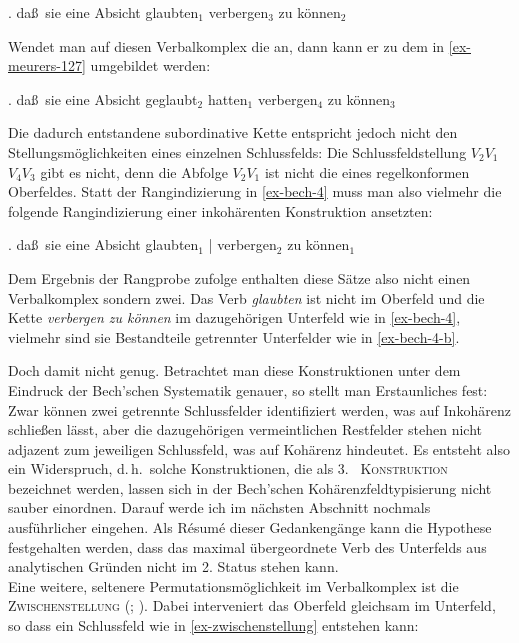 \ex. \label{ex-bech-4} da\ss\ sie eine Absicht glaubten$_1$ verbergen$_3$ zu können$_2$ \hfill \citep[\S 62]{Bech:55} 

Wendet man auf diesen Verbalkomplex die  an, dann kann er zu dem in \ref{ex-meurers-127} umgebildet werden:

\ex. da\ss\ sie eine Absicht geglaubt$_2$ hatten$_1$ verbergen$_4$ zu können$_3$ \\ \citep[(127)]{Meurers:99}\label{ex-meurers-127}

Die dadurch entstandene subordinative Kette entspricht jedoch nicht den Stellungsmöglichkeiten eines einzelnen Schlussfelds: Die Schlussfeldstellung $V_2 V_1$ $V_4 V_3$ gibt es nicht, denn die Abfolge $V_2 V_1$ ist nicht die eines regelkonformen Oberfeldes. Statt der Rangindizierung in \ref{ex-bech-4} muss man also vielmehr die folgende Rangindizierung einer inkohärenten Konstruktion ansetzten:

\ex. \label{ex-bech-4-b}da\ss\ sie eine Absicht glaubten$_1$ | verbergen$_2$ zu können$_1$
 
Dem Ergebnis der Rangprobe zufolge enthalten diese Sätze also nicht einen Verbalkomplex sondern zwei. Das Verb {\it glaubten} ist nicht im Oberfeld und die Kette {\it verbergen zu können} im dazugehörigen Unterfeld wie in \ref{ex-bech-4}, vielmehr sind sie Bestandteile getrennter Unterfelder wie in \ref{ex-bech-4-b}.

Doch damit nicht genug. Betrachtet man diese Konstruktionen unter dem Eindruck der Bech'schen Systematik genauer, so stellt man Erstaunliches fest: Zwar können zwei getrennte Schlussfelder identifiziert werden, was auf Inkohärenz schlie\ss en lässt, aber die dazugehörigen vermeintlichen Restfelder stehen nicht adjazent zum jeweiligen Schlussfeld, was auf Kohärenz hindeutet. Es entsteht also ein Widerspruch, d.\,h.\ solche Konstruktionen, die als \textsc{3.~ Konstruktion} \citep{denBesten:Rutten:89} bezeichnet werden, lassen sich in der Bech'schen Kohärenzfeldtypisierung nicht sauber einordnen. Darauf werde ich im nächsten Abschnitt nochmals ausführlicher eingehen. Als R\'esum\'e dieser Gedankengänge kann die Hypothese festgehalten werden, dass das maximal übergeordnete Verb des Unterfelds aus analytischen Gründen nicht im 2. Status stehen kann. \\ 
 
Eine weitere, seltenere Permutationsmöglichkeit im Verbalkomplex ist die \linebreak \textsc{Zwischenstellung}  (\citealt{Meurers:94}; \citealt[84ff]{Meurers:99}). Dabei interveniert das Oberfeld gleichsam im Unterfeld, so dass ein Schlussfeld wie in \ref{ex-zwischenstellung} entstehen kann: 

